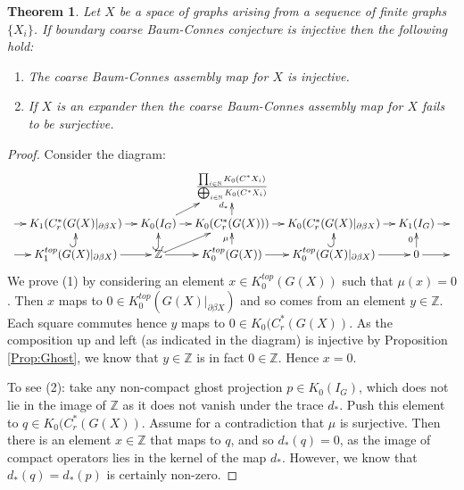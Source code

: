 \documentclass[11pt]{amsart}
\theoremstyle{plain}
\newtheorem{theorem}{Theorem}%
\theoremstyle{definition}%
\theoremstyle{remark}%
\begin{document}
\begin{theorem}\label{Prop:Cor}
Let $X$ be a space of graphs arising from a sequence of finite graphs $\lbrace X_{i} \rbrace$. If  boundary coarse Baum-Connes conjecture is injective then the following hold:
\begin{enumerate}
\item The coarse Baum-Connes assembly map for $X$ is injective.
\item If $X$ is an expander then the coarse Baum-Connes assembly map for $X$ fails to be surjective.
\end{enumerate}
\end{theorem}
\begin{proof}
Consider the diagram:
$$
\xymatrix@=1em{& & & \frac{\prod_{i\in\mathbb{N}}K_{0}(C^{*}X_{i})}{\bigoplus_{i\in\mathbb{N}}K_{0}(C^{*}X_{i})}& & &\\
\ar[r] & K_{1}(C^{*}_{r}(G(X)|_{\partial\beta X}) \ar[r] & K_{0}(I_{G})\ar[ur] \ar[r]& K_{0}(C^{*}_{r}(G(X)))\ar[u]^{d_{*}} \ar[r]& K_{0}(C^{*}_{r}(G(X)|_{\partial\beta X})\ar[r] & K_{1}(I_{G}) \ar[r] & \\
\ar[r] & K_{1}^{top}(G(X)|_{\partial\beta X}) \ar[r] \ar@{^{(}->}[u]& \mathbb{Z} \ar@{^{(}->}[ur] \ar[r]\ar@{^{(}->}[u]& K_{0}^{top}(G(X)) \ar[r]\ar[u]^{\mu}& K_{0}^{top}(G(X)|_{\partial\beta X}) \ar[r]\ar@{^{(}->}[u]& 0\ar[u]^{0} \ar[r] & 
}
$$
We prove (1) by considering an element $x \in K_{0}^{top}(G(X))$ such that $\mu(x)=0$. Then $x$ maps to $0\in K_{0}^{top}(G(X)|_{\partial\beta X})$ and so comes from an element $y \in \mathbb{Z}$. Each square commutes hence $y$ maps to $0 \in K_{0}(C^{*}_{r}(G(X))$. As the composition up and left (as indicated in the diagram) is injective by Proposition \ref{Prop:Ghost}, we know that $y \in \mathbb{Z}$  is in fact $0 \in \mathbb{Z}$. Hence $x=0$.

To see (2): take any non-compact ghost projection $p \in K_{0}(I_{G})$, which does not lie in the image of $\mathbb{Z}$ as it does not vanish under the trace $d_{*}$. Push this element to $q \in K_{0}(C^{*}_{r}(G(X))$. Assume for a contradiction that $\mu$ is surjective. Then there is an element $x \in \mathbb{Z}$ that maps to $q$, and so $d_{*}(q)=0$, as the image of compact operators lies in the kernel of the map $d_{*}$. However, we know that $d_{*}(q)=d_{*}(p)$ is certainly non-zero.
\end{proof}
\end{document}
